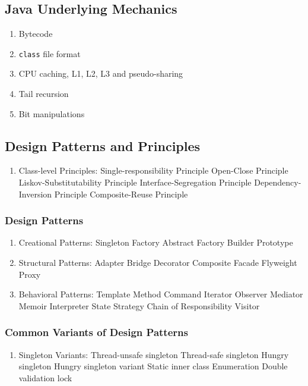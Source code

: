 \documentclass[11pt, twocolumn]{article}
\begin{document}
\subsection{Java Underlying Mechanics}
\begin{enumerate}
	\item Bytecode
	\item \texttt{class} file format
	\item CPU caching, L1, L2, L3 and pseudo-sharing
	\item Tail recursion
	\item Bit manipulations
\end{enumerate}

\subsection{Design Patterns and Principles}
\begin{enumerate}
	\item Class-level Principles:
	\subitem Single-responsibility Principle
	\subitem Open-Close Principle
	\subitem Liskov-Substitutability Principle
	\subitem Interface-Segregation Principle
	\subitem Dependency-Inversion Principle
	\subitem Composite-Reuse Principle
\end{enumerate}

\subsubsection{Design Patterns}
\begin{enumerate}
	\item Creational Patterns:
	\subitem Singleton
	\subitem Factory
	\subitem Abstract Factory
	\subitem Builder
	\subitem Prototype
	\item Structural Patterns:
	\subitem Adapter
	\subitem Bridge
	\subitem Decorator
	\subitem Composite
	\subitem Facade
	\subitem Flyweight
	\subitem Proxy
	\item Behavioral Patterns:
	\subitem Template Method
	\subitem Command
	\subitem Iterator
	\subitem Observer
	\subitem Mediator
	\subitem Memoir
	\subitem Interpreter
	\subitem State
	\subitem Strategy
	\subitem Chain of Responsibility
	\subitem Visitor
\end{enumerate}

\subsubsection{Common Variants of Design Patterns}
\begin{enumerate}
	\item Singleton Variants:
	\subitem Thread-unsafe singleton
	\subitem Thread-safe singleton
	\subitem Hungry singleton
	\subitem Hungry singleton variant
	\subitem Static inner class
	\subitem Enumeration
	\subitem Double validation lock
\end{enumerate}
\end{document}
